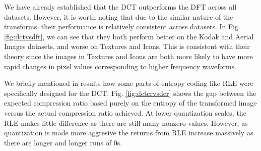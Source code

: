 We have already established that the DCT outperforms the DFT across all datasets. However, it is worth noting that due to the similar nature of the transforms, their performance is relatively consistent across datasets. In Fig. \ref{fig:dctvsdft}, we can see that they both perform better on the Kodak and Aerial Images datasets, and worse on Textures and Icons. This is consistent with their theory since the images in Textures and Icons are both more likely to have more rapid changes in pixel values corresponding to higher frequency waveforms.

We briefly mentioned in results how some parts of entropy coding like RLE were specifically designed for the DCT. Fig. \ref{fig:dctcrvsdcr} shows the gap between the expected compression ratio based purely on the entropy of the transformed image versus the actual compression ratio achieved. At lower quantization scales, the RLE makes little difference as there are still many nonzero values. However, as quantization is made more aggresive the returns from RLE increase massively as there are longer and longer runs of 0s.